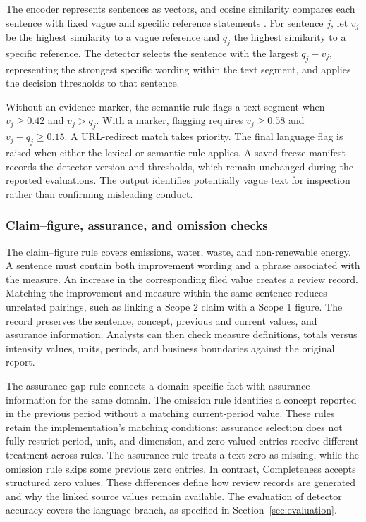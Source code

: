 The  encoder represents sentences as vectors, and cosine similarity compares each sentence with fixed vague and specific reference statements \cite{reimers2019}\cite{song2020}. For sentence $j$, let $v_j$ be the highest similarity to a vague reference and $q_j$ the highest similarity to a specific reference. The detector selects the sentence with the largest $q_j-v_j$, representing the strongest specific wording within the text segment, and applies the decision thresholds to that sentence.

Without an evidence marker, the semantic rule flags a text segment when $v_j\geq0.42$ and $v_j>q_j$. With a marker, flagging requires $v_j\geq0.58$ and $v_j-q_j\geq0.15$. A URL-redirect match takes priority. The final language flag is raised when either the lexical or semantic rule applies. A saved freeze manifest records the detector version and thresholds, which remain unchanged during the reported evaluations. The output identifies potentially vague text for inspection rather than confirming misleading conduct.

\subsubsection{Claim--figure, assurance, and omission checks}

The claim--figure rule covers emissions, water, waste, and non-renewable energy. A sentence must contain both improvement wording and a phrase associated with the measure. An increase in the corresponding filed value creates a review record. Matching the improvement and measure within the same sentence reduces unrelated pairings, such as linking a Scope 2 claim with a Scope 1 figure. The record preserves the sentence, concept, previous and current values, and assurance information. Analysts can then check measure definitions, totals versus intensity values, units, periods, and business boundaries against the original report.

The assurance-gap rule connects a domain-specific fact with assurance information for the same domain. The omission rule identifies a concept reported in the previous period without a matching current-period value. These rules retain the implementation's matching conditions: assurance selection does not fully restrict period, unit, and dimension, and zero-valued entries receive different treatment across rules. The assurance rule treats a text zero as missing, while the omission rule skips some previous zero entries. In contrast, Completeness accepts structured zero values. These differences define how review records are generated and why the linked source values remain available. The evaluation of detector accuracy covers the language branch, as specified in Section~\ref{sec:evaluation}.

